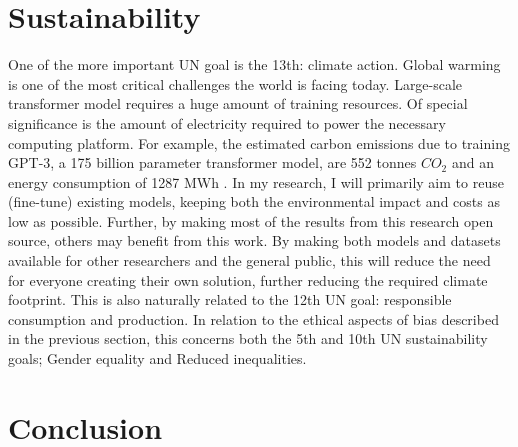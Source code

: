 \documentclass[12pt]{book}
\begin{document}
\section{Sustainability}
One of the more important UN goal is the 13th: climate action. Global warming is one of the most critical challenges the world is facing today. Large-scale transformer model requires a huge amount of training resources. Of special significance is the amount of electricity required to power the necessary computing platform. For example, the estimated carbon emissions due to training GPT-3, a 175 billion parameter transformer model, are 552 tonnes $CO_2$ and an energy consumption of 1287 MWh \cite{patterson2021carbon}. In my research, I will primarily aim to reuse (fine-tune) existing models, keeping both the environmental impact and costs as low as possible. Further, by making most of the results from this research open source, others may benefit from this work. By making both models and datasets available for other researchers and the general public, this will reduce the need for everyone creating their own solution, further reducing the required climate footprint. This is also naturally related to the 12th UN goal: responsible consumption and production. In relation to the ethical aspects of bias described in the previous section, this concerns both the 5th and 10th UN sustainability goals; Gender equality and Reduced inequalities.

\section{Conclusion}


%
\vspace{1cm}
\newpage
\printbibliography
\end{document}
